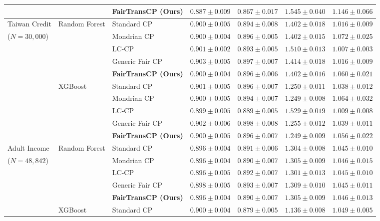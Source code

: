 \documentclass[twoside]{article}
\begin{document}
\begin{table}[t]
\begin{tabular}{lllcccc}
 &  & \textbf{FairTransCP (Ours)} & $0.887 \pm 0.009$ & $0.867 \pm 0.017$ & $1.545 \pm 0.040$ & $\mathbf{1.146 \pm 0.066}$ \\
\midrule
Taiwan Credit & Random Forest & Standard CP & $0.900 \pm 0.005$ & $0.894 \pm 0.008$ & $1.402 \pm 0.018$ & $1.016 \pm 0.009$ \\
($N=30{,}000$) &  & Mondrian CP & $0.900 \pm 0.004$ & $0.896 \pm 0.005$ & $1.402 \pm 0.015$ & $1.072 \pm 0.025$ \\
 &  & LC-CP & $0.901 \pm 0.002$ & $0.893 \pm 0.005$ & $1.510 \pm 0.013$ & $\mathbf{1.007 \pm 0.003}$ \\
 &  & Generic Fair CP & $0.903 \pm 0.005$ & $0.897 \pm 0.007$ & $1.414 \pm 0.018$ & $1.016 \pm 0.009$ \\
 &  & \textbf{FairTransCP (Ours)} & $0.900 \pm 0.004$ & $0.896 \pm 0.006$ & $1.402 \pm 0.016$ & $\mathbf{1.060 \pm 0.021}$ \\
\cmidrule{2-7}
 & XGBoost & Standard CP & $0.901 \pm 0.005$ & $0.896 \pm 0.007$ & $1.250 \pm 0.011$ & $1.038 \pm 0.012$ \\
 &  & Mondrian CP & $0.900 \pm 0.005$ & $0.894 \pm 0.007$ & $1.249 \pm 0.008$ & $1.064 \pm 0.032$ \\
 &  & LC-CP & $0.899 \pm 0.005$ & $0.889 \pm 0.005$ & $1.529 \pm 0.019$ & $\mathbf{1.009 \pm 0.008}$ \\
 &  & Generic Fair CP & $0.902 \pm 0.006$ & $0.898 \pm 0.008$ & $1.255 \pm 0.012$ & $1.039 \pm 0.011$ \\
 &  & \textbf{FairTransCP (Ours)} & $0.900 \pm 0.005$ & $0.896 \pm 0.007$ & $1.249 \pm 0.009$ & $\mathbf{1.056 \pm 0.022}$ \\
\midrule
Adult Income & Random Forest & Standard CP & $0.896 \pm 0.004$ & $0.891 \pm 0.006$ & $1.304 \pm 0.008$ & $1.045 \pm 0.010$ \\
($N=48{,}842$) &  & Mondrian CP & $0.896 \pm 0.004$ & $0.890 \pm 0.007$ & $1.305 \pm 0.009$ & $1.046 \pm 0.015$ \\
 &  & LC-CP & $0.896 \pm 0.005$ & $0.892 \pm 0.007$ & $1.301 \pm 0.013$ & $\mathbf{1.045 \pm 0.010}$ \\
 &  & Generic Fair CP & $0.898 \pm 0.005$ & $0.893 \pm 0.007$ & $1.309 \pm 0.010$ & $1.045 \pm 0.011$ \\
 &  & \textbf{FairTransCP (Ours)} & $0.896 \pm 0.004$ & $0.890 \pm 0.007$ & $1.305 \pm 0.009$ & $\mathbf{1.046 \pm 0.013}$ \\
\cmidrule{2-7}
 & XGBoost & Standard CP & $0.900 \pm 0.004$ & $0.879 \pm 0.005$ & $1.136 \pm 0.008$ & $1.049 \pm 0.005$ \\

\end{tabular}
\end{table}
\end{document}
